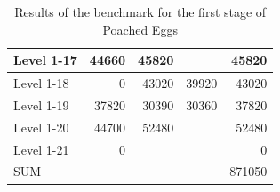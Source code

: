 \begin{table}[h]
\begin{center}
\begin{tabular}{l | r r r r}
			\hline
			Level  1-17 &  44660 &  45820  &         &   45820 \\
			\hline
			Level  1-18 &  0     &  43020  &  39920  &   43020 \\
			\hline
			Level  1-19 &  37820 &  30390  &  30360  &   37820 \\
			\hline
			Level  1-20 &  44700 &  52480  &         &   52480 \\
			\hline
			Level 1-21  &  0     &         &         &   0 \\
			\hline
			\hline
			SUM         &  &  &   &  871050
		\end{tabular}
	\end{center}
	\caption{Results of the benchmark for the first stage of Poached Eggs\label{tab:stage1}}
\end{table}
